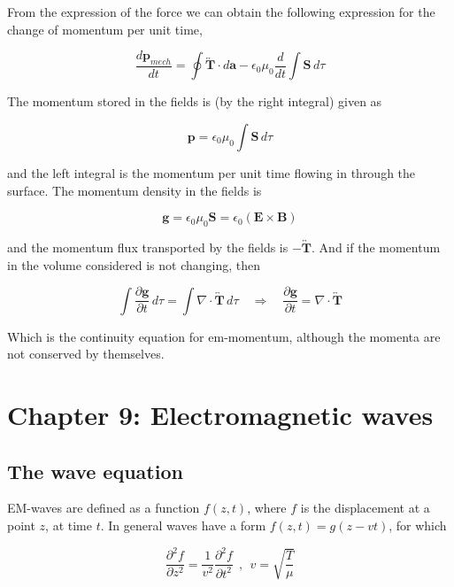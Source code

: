 \documentclass[a4paper]{article}
\begin{document}
From the expression of the force we can obtain the following expression for the change of momentum per unit time,

\begin{equation}
    \frac{d\bm{p}_{mech}}{dt}=\oint \overleftrightarrow{\bm{T}}\cdot d\bm{a}-\epsilon_0\mu_0\frac{d}{dt}\int\bm{S}\,d\tau
\end{equation}

The momentum stored in the fields is (by the right integral) given as

\begin{equation}
    \bm{p}=\epsilon_0\mu_0\int\bm{S}\,d\tau
\end{equation}

and the left integral is the momentum per unit time flowing in through the surface. The momentum density in the fields is

\begin{equation}
    \bm{g}=\epsilon_0\mu_0\bm{S}=\epsilon_0(\bm{E}\times\bm{B})
\end{equation}

and the momentum flux transported by the fields is $-\overleftrightarrow{\bm{T}}$. And if the momentum in the volume considered is not changing, then

\begin{equation}
    \int\frac{\partial \bm{g}}{\partial t}\,d\tau=\int\nabla\cdot\overleftrightarrow{\bm{T}}\,d\tau\quad\Rightarrow\quad \frac{\partial \bm{g}}{\partial t}=\nabla\cdot\overleftrightarrow{\bm{T}}
\end{equation}

Which is the continuity equation for em-momentum, although the momenta are not conserved by themselves. 

\section{Chapter 9: Electromagnetic waves}

\subsection{The wave equation}

EM-waves are defined as a function $f(z, t)$, where $f$ is the displacement at a point $z$, at time $t$. In general waves have a form $f(z, t)=g(z-vt)$, for which

\begin{equation}
    \frac{\partial^2 f}{\partial z^2}=\frac{1}{v^2}\frac{\partial^2 f}{\partial t^2} \ \ , \ \ v=\sqrt{\frac{T}{\mu}}
\end{equation}
\end{document}
